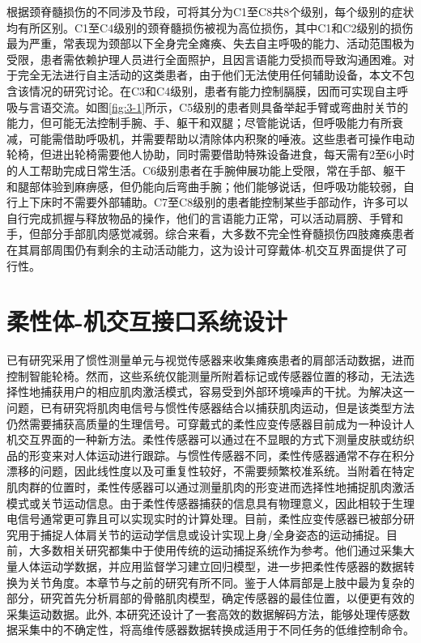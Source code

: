 根据颈脊髓损伤的不同涉及节段，可将其分为C1至C8共8个级别，每个级别的症状均有所区别。C1至C4级别的颈脊髓损伤被视为高位损伤，其中C1和C2级别的损伤最为严重，常表现为颈部以下全身完全瘫痪、失去自主呼吸的能力、活动范围极为受限，患者需依赖护理人员进行全面照护，且因言语能力受损而导致沟通困难。对于完全无法进行自主活动的这类患者，由于他们无法使用任何辅助设备，本文不包含该情况的研究讨论。在C3和C4级别，患者有能力控制膈膜，因而可实现自主呼吸与言语交流。如图\ref{fig:3-1}所示，C5级别的患者则具备举起手臂或弯曲肘关节的能力，但可能无法控制手腕、手、躯干和双腿；尽管能说话，但呼吸能力有所衰减，可能需借助呼吸机，并需要帮助以清除体内积聚的唾液。这些患者可操作电动轮椅，但进出轮椅需要他人协助，同时需要借助特殊设备进食，每天需有2至6小时的人工帮助完成日常生活。C6级别患者在手腕伸展功能上受限，常在手部、躯干和腿部体验到麻痹感，但仍能向后弯曲手腕；他们能够说话，但呼吸功能较弱，自行上下床时不需要外部辅助。C7至C8级别的患者能控制某些手部动作，许多可以自行完成抓握与释放物品的操作，他们的言语能力正常，可以活动肩膀、手臂和手，但部分手部肌肉感觉减弱。综合来看，大多数不完全性脊髓损伤四肢瘫痪患者在其肩部周围仍有剩余的主动活动能力\cite{shefflerNeuromuscularElectricalStimulation2007}，这为设计可穿戴体-机交互界面提供了可行性。

\section{柔性体-机交互接口系统设计} 

已有研究采用了惯性测量单元与视觉传感器来收集瘫痪患者的肩部活动数据，进而控制智能轮椅\cite{thorpUpperBodyBasedPower2016d,seanez-gonzalezCursorControlKalman2014}。然而，这些系统仅能测量所附着标记或传感器位置的移动，无法选择性地捕获用户的相应肌肉激活模式，容易受到外部环境噪声的干扰。为解决这一问题，已有研究将肌肉电信号与惯性传感器结合以捕获肌肉运动\cite{rizzoglioHybridBodyMachineInterface2020}，但是该类型方法仍然需要捕获高质量的生理信号。可穿戴式的柔性应变传感器目前成为一种设计人机交互界面的一种新方法\cite{dongStretchableHumanMachine2020}。柔性传感器可以通过在不显眼的方式下测量皮肤或纺织品的形变来对人体运动进行跟踪。与惯性传感器不同，柔性传感器通常不存在积分漂移的问题，因此线性度以及可重复性较好，不需要频繁校准系统。当附着在特定肌肉群的位置时，柔性传感器可以通过测量肌肉的形变进而选择性地捕捉肌肉激活模式或关节运动信息。由于柔性传感器捕获的信息具有物理意义，因此相较于生理电信号通常更可靠且可以实现实时的计算处理。目前，柔性应变传感器已被部分研究用于捕捉人体肩关节的运动学信息\cite{jinSoftSensingShirt2020,leePrintableSkinAdhesive2016,samper-escuderoEfficientMultiaxialShoulderMotion2020}或设计实现上身/全身姿态的运动捕捉\cite{contreras-gonzalezEfficientUpperLimb2020,ogataEstimatingMovementsHuman2019,kimDeepFullBodyMotion2019}。目前，大多数相关研究都集中于使用传统的运动捕捉系统作为参考。他们通过采集大量人体运动学数据，并应用监督学习建立回归模型，进一步把柔性传感器的数据转换为关节角度。本章节与之前的研究有所不同。鉴于人体肩部是上肢中最为复杂的部分，研究首先分析肩部的骨骼肌肉模型，确定传感器的最佳位置，以便更有效的采集运动数据。此外, 本研究还设计了一套高效的数据解码方法，能够处理传感数据采集中的不确定性，将高维传感器数据转换成适用于不同任务的低维控制命令。

